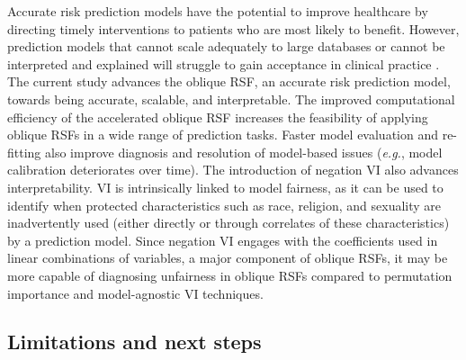 \documentclass[12pt]{article}\usepackage[]{graphicx}\usepackage[]{xcolor}
\newcommand{\eg}{\textit{e.g.}}
\begin{document}
Accurate risk prediction models have the potential to improve healthcare by directing timely interventions to patients who are most likely to benefit. However, prediction models that cannot scale adequately to large databases or cannot be interpreted and explained will struggle to gain acceptance in clinical practice \citep{moss2022demystifying}. The current study advances the oblique RSF, an accurate risk prediction model, towards being accurate, scalable, and interpretable. The improved computational efficiency of the accelerated oblique RSF increases the feasibility of applying oblique RSFs in a wide range of prediction tasks. Faster model evaluation and re-fitting also improve diagnosis and resolution of model-based issues (\eg, model calibration deteriorates over time). The introduction of negation VI also advances interpretability. VI is intrinsically linked to model fairness, as it can be used to identify when protected characteristics such as race, religion, and sexuality are inadvertently used (either directly or through correlates of these characteristics) by a prediction model. Since negation VI engages with the coefficients used in linear combinations of variables, a major component of oblique RSFs, it may be more capable of diagnosing unfairness in oblique RSFs compared to permutation importance and model-agnostic VI techniques.

\subsection{Limitations and next steps}
\end{document}
